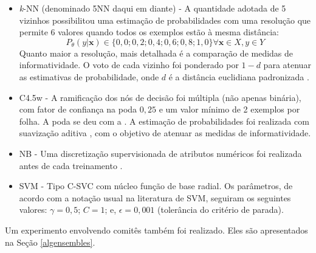 \begin{itemize}
   \item \textit{k}-NN (denominado 5NN daqui em diante) - A quantidade adotada de 5 vizinhos possibilitou uma estimação de probabilidades com uma resolução que permite 6 valores quando todos os exemplos estão à mesma distância: 
   \[P_{\theta}(y|\bm{x}) \in \{0,0; 0,2; 0,4; 0,6; 0,8; 1,0\} \forall \bm{x} \in X, y \in Y\]
   Quanto maior a resolução, mais detalhada é a comparação de medidas de informatividade.
O voto de cada vizinho foi ponderado por $1 - d$ para atenuar as estimativas de probabilidade, onde $d$ é a distância euclidiana padronizada \cite{kreyszig2007advanced}.
\item C4.5w - A ramificação dos nós de decisão foi múltipla (não apenas binária), com fator de confiança na poda $0,25$ e %
um valor mínimo de 2 exemplos por folha.
A poda se deu com a .
A estimação de probabilidades foi realizada com suavização aditiva \cite{books/daglib/0021593}, com o objetivo de atenuar as medidas de informatividade.
	\item NB - Uma discretização supervisionada de atributos numéricos foi realizada antes de cada treinamento \cite{conf/ijcai/FayyadI93}.
	\item SVM - Tipo C-SVC \cite{journals/ml/CortesV95} com núcleo função de base radial.
Os parâmetros, de acordo com a notação usual na literatura de SVM, seguiram os seguintes valores: $\gamma=0,5$;
$C=1$; e, $\epsilon=0,001$ (tolerância do critério de parada). %

\end{itemize}

Um experimento envolvendo comitês também foi realizado.
Eles são apresentados na Seção \ref{algensembles}.

